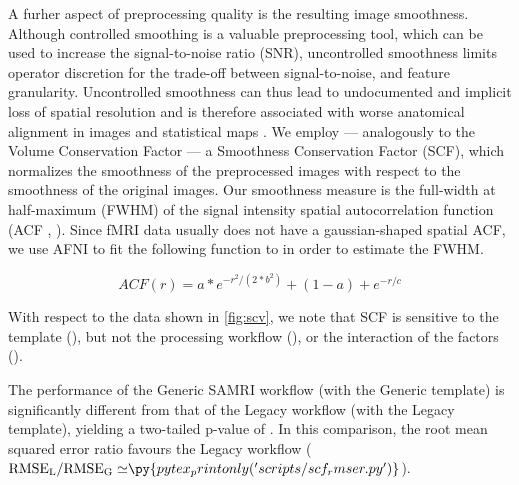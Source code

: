 A furher aspect of preprocessing quality is the resulting image smoothness.
Although controlled smoothing is a valuable preprocessing tool, which can be used to increase the signal-to-noise ratio (SNR), uncontrolled smoothness limits operator discretion for the trade-off between signal-to-noise, and feature granularity.
Uncontrolled smoothness can thus lead to undocumented and implicit loss of spatial resolution and is therefore associated with worse anatomical alignment in images and statistical maps \cite{fmriprep}.
We employ --- analogously to the Volume Conservation Factor --- a Smoothness Conservation Factor (SCF), which normalizes the smoothness of the preprocessed images with respect to the smoothness of the original images.
Our smoothness measure is the full-width at half-maximum (FWHM) of the signal intensity spatial autocorrelation function (ACF \cite{eklund2016cluster}, \cite{cox2017fmri}).
Since fMRI data usually does not have a gaussian-shaped spatial ACF, we use AFNI \cite{cox1996afni} to fit the following function to in order to estimate the FWHM.

\begin{equation} \label{eq:acf}
        ACF(r)
        = a * e^{ -r^{2}/ (2 * b^{2}) } + (1 - a) + e^{-r/c}
\end{equation}

With respect to the data shown in \cref{fig:scv}, we note that SCF is sensitive to
the template (),
but not
the processing workflow (),
or the interaction of the factors ().

The performance of the Generic SAMRI workflow (with the Generic template) is significantly different from that of the Legacy workflow (with the Legacy template), yielding a two-tailed p-value of .
In this comparison, the root mean squared error ratio favours the Legacy workflow
($\mathrm{RMSE_{L}/RMSE_{G}\simeq} \py{pytex_printonly('scripts/scf_rmser.py')}$).

